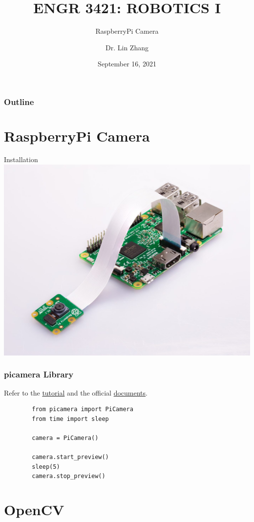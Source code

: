 \documentclass[12pt,letterpaper]{beamer}
\title[Robotics I]
{ENGR 3421: ROBOTICS I}
\subtitle{RaspberryPi Camera}
\author[Zhang, Lin]
{Dr. Lin Zhang}
\institute[UCA] %
{
  Department of Physics and Astronomy\\
  University of Central Arkansas
}
\date[Robotics1 2021] %
{September 16, 2021}
\begin{document}
\frame{\titlepage}

\begin{frame}
\frametitle{Outline}
\tableofcontents
\end{frame}

\section{RaspberryPi Camera}

\begin{frame}{Installation}
    \centering
    \includegraphics[width=0.8\linewidth]{picamera_attached}
\end{frame}

\begin{frame}[fragile]
    \frametitle{picamera Library}
    Refer to the \href{https://projects.raspberrypi.org/en/projects/getting-started-with-picamera}{tutorial} and the official \href{https://picamera.readthedocs.io/en/release-1.13/}{documents}.
    \scriptsize
    \begin{verbatim}
        from picamera import PiCamera
        from time import sleep

        camera = PiCamera()

        camera.start_preview()
        sleep(5)
        camera.stop_preview()
    \end{verbatim}
\end{frame}

\section{OpenCV}
\end{document}
